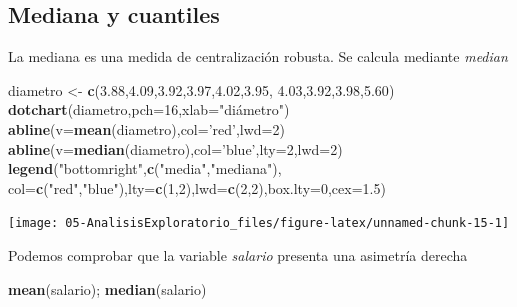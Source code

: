 \documentclass[]{book}
\newenvironment{Shaded}{\begin{snugshade}}{\end{snugshade}}
\newcommand{\KeywordTok}[1]{\textcolor[rgb]{0.13,0.29,0.53}{\textbf{#1}}}
\newcommand{\DataTypeTok}[1]{\textcolor[rgb]{0.13,0.29,0.53}{#1}}
\newcommand{\DecValTok}[1]{\textcolor[rgb]{0.00,0.00,0.81}{#1}}
\newcommand{\FloatTok}[1]{\textcolor[rgb]{0.00,0.00,0.81}{#1}}
\newcommand{\StringTok}[1]{\textcolor[rgb]{0.31,0.60,0.02}{#1}}
\newcommand{\NormalTok}[1]{#1}
\begin{document}
\subsection{Mediana y cuantiles}\label{mediana-y-cuantiles}

La mediana es una medida de centralización robusta. Se calcula mediante
\emph{median}

\begin{Shaded}
\begin{Highlighting}[]
\NormalTok{diametro <-}\StringTok{ }\KeywordTok{c}\NormalTok{(}\FloatTok{3.88}\NormalTok{,}\FloatTok{4.09}\NormalTok{,}\FloatTok{3.92}\NormalTok{,}\FloatTok{3.97}\NormalTok{,}\FloatTok{4.02}\NormalTok{,}\FloatTok{3.95}\NormalTok{, }\FloatTok{4.03}\NormalTok{,}\FloatTok{3.92}\NormalTok{,}\FloatTok{3.98}\NormalTok{,}\FloatTok{5.60}\NormalTok{)}
\KeywordTok{dotchart}\NormalTok{(diametro,}\DataTypeTok{pch=}\DecValTok{16}\NormalTok{,}\DataTypeTok{xlab=}\StringTok{"diámetro"}\NormalTok{)}
\KeywordTok{abline}\NormalTok{(}\DataTypeTok{v=}\KeywordTok{mean}\NormalTok{(diametro),}\DataTypeTok{col=}\StringTok{'red'}\NormalTok{,}\DataTypeTok{lwd=}\DecValTok{2}\NormalTok{)}
\KeywordTok{abline}\NormalTok{(}\DataTypeTok{v=}\KeywordTok{median}\NormalTok{(diametro),}\DataTypeTok{col=}\StringTok{'blue'}\NormalTok{,}\DataTypeTok{lty=}\DecValTok{2}\NormalTok{,}\DataTypeTok{lwd=}\DecValTok{2}\NormalTok{)}
\KeywordTok{legend}\NormalTok{(}\StringTok{"bottomright"}\NormalTok{,}\KeywordTok{c}\NormalTok{(}\StringTok{"media"}\NormalTok{,}\StringTok{"mediana"}\NormalTok{),}
       \DataTypeTok{col=}\KeywordTok{c}\NormalTok{(}\StringTok{"red"}\NormalTok{,}\StringTok{"blue"}\NormalTok{),}\DataTypeTok{lty=}\KeywordTok{c}\NormalTok{(}\DecValTok{1}\NormalTok{,}\DecValTok{2}\NormalTok{),}\DataTypeTok{lwd=}\KeywordTok{c}\NormalTok{(}\DecValTok{2}\NormalTok{,}\DecValTok{2}\NormalTok{),}\DataTypeTok{box.lty=}\DecValTok{0}\NormalTok{,}\DataTypeTok{cex=}\FloatTok{1.5}\NormalTok{)}
\end{Highlighting}
\end{Shaded}

\begin{center}\texttt{[image: 05-AnalisisExploratorio\_files/figure-latex/unnamed-chunk-15-1]} \end{center}

Podemos comprobar que la variable \emph{salario} presenta una asimetría
derecha

\begin{Shaded}
\begin{Highlighting}[]
\KeywordTok{mean}\NormalTok{(salario); }\KeywordTok{median}\NormalTok{(salario)}
\end{Highlighting}
\end{Shaded}
\end{document}
